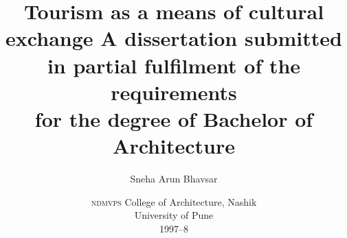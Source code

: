 \documentclass[a5paper,10pt,twoside]{book}
\title{
  Tourism as a means of cultural exchange
  \newline
  \newline
  \small{
  A dissertation submitted in partial fulfilment of the requirements\\
  for the degree of Bachelor of Architecture
  }
}
\author{Sneha Arun Bhavsar}
\date{
    \small{
    \textsc{ndmvps} College of Architecture, Nashik\\
    University of Pune\\
    1997--8
  }
}
\begin{document}
  \maketitle

  \pagebreak

  

  \pagebreak

  \tableofcontents
  \listoffigures
  \listoftables

  \vfill
  
  \pagebreak

    
  
  
  
  
  
  
\end{document}
